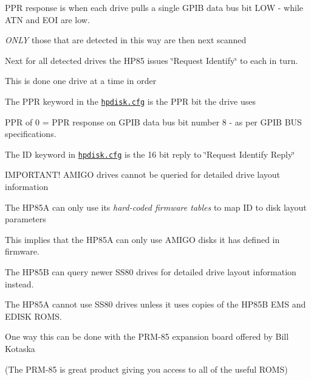 \begin{DoxyItemize}
\begin{DoxyItemize}
\item P\+PR response is when each drive pulls a single G\+P\+IB data bus bit L\+OW -\/ while A\+TN and E\+OI are low.
\begin{DoxyItemize}
\item {\itshape O\+N\+LY} those that are detected in this way are then next scanned
\end{DoxyItemize}
\item Next for all detected drives the H\+P85 issues \char`\"{}\+Request Identify\char`\"{} to each in turn.
\begin{DoxyItemize}
\item This is done one drive at a time in order
\item The P\+PR keyword in the \href{sdcard/hpdisk.cfg}{\tt hpdisk.\+cfg} is the P\+PR bit the drive uses
\begin{DoxyItemize}
\item P\+PR of 0 = P\+PR response on G\+P\+IB data bus bit number 8 -\/ as per G\+P\+IB B\+US specifications.
\end{DoxyItemize}
\item The ID keyword in \href{sdcard/hpdisk.cfg}{\tt hpdisk.\+cfg} is the 16 bit reply to \char`\"{}\+Request Identify Reply\char`\"{}
\begin{DoxyItemize}
\item I\+M\+P\+O\+R\+T\+A\+N\+T! A\+M\+I\+GO drives cannot be queried for detailed drive layout information
\begin{DoxyItemize}
\item The H\+P85A can only use its {\itshape hard-\/coded firmware tables} to map ID to disk layout parameters
\item This implies that the H\+P85A can only use A\+M\+I\+GO disks it has defined in firmware.
\end{DoxyItemize}
\item The H\+P85B can query newer S\+S80 drives for detailed drive layout information instead.
\item The H\+P85A cannot use S\+S80 drives unless it uses copies of the H\+P85B E\+MS and E\+D\+I\+SK R\+O\+MS.
\begin{DoxyItemize}
\item One way this can be done with the P\+R\+M-\/85 expansion board offered by Bill Kotaska
\begin{DoxyItemize}
\item (The P\+R\+M-\/85 is great product giving you access to all of the useful R\+O\+MS) 


\end{DoxyItemize}
\end{DoxyItemize}
\end{DoxyItemize}
\end{DoxyItemize}
\end{DoxyItemize}
\end{DoxyItemize}

